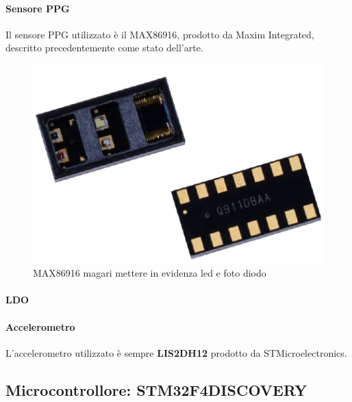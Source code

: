 \paragraph{Sensore PPG} Il sensore PPG utilizzato è il MAX86916, prodotto da Maxim Integrated, descritto precedentemente come stato dell'arte.

\begin{figure}[tb]
	\centering
	\includegraphics[width=0.6\linewidth]{ImageFiles/Hardware/ImmagineMAX86916}
	\caption{MAX86916 magari mettere in evidenza led e foto diodo}
	\label{fig:ImmagineMAX86916}
\end{figure}

\paragraph{LDO} 

\paragraph{Accelerometro} L'accelerometro utilizzato è sempre \textbf{LIS2DH12} prodotto da STMicroelectronics.

\subsection{Microcontrollore: STM32F4DISCOVERY}
